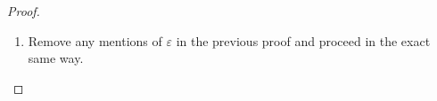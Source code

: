 \documentclass[11pt, a4paper, oneside]{memoir}
\theoremstyle{plain}\newtheorem{theorem}[subsection]{Theorem}
\theoremstyle{definition}
\begin{document}
\begin{proof}
\begin{enumerate}
Let \(P\) be a partition \(0=t_0<t_1<\ldots<t_m=1\) of \([0,1]\).
Using the Lipschitz bound \((d(x,y)+\varepsilon)\) we then get
\begin{align}
\sum_{i=0}^{m-1} d\left(\sigma(t_i),\sigma(t_{i+1})\right)
&\leq\sum_{i=0}^{m-1} (d(x,y)+\varepsilon)|t_i-t_{i+1}|\notag\\
&=(d(x,y)+\varepsilon)\sum_{i=0}^{m-1}|t_i-t_{i+1}|\notag\\
&=d(x,y)+\varepsilon.\label{eq:mid4}
\end{align}
As this holds for all partitions of \([0,1]\) the definition of length gives us \(L(\sigma)\leq d(x,y)+\varepsilon\).
Because \(\varepsilon\) was arbitrary, we get that the infimum of lengths of \emph{all} rectifiable curves \(\sigma'\) must be at most the infimum of curves constructed in this way for any given \(\varepsilon\).
This infimum is \(d(x,y)\), so \(L(\sigma')\leq d(x,y)\) whereby \(X\) is a length space.

\item Remove any mentions of \(\varepsilon\) in the previous proof and proceed in the exact same way.    
\end{enumerate}
\end{proof}
\end{document}
